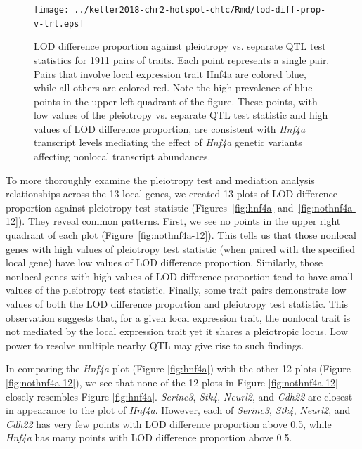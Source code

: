 \documentclass[oneside]{book}\usepackage[]{graphicx}\usepackage[]{color}
\begin{document}
\begin{figure}
    \centering
    \texttt{[image: ../keller2018-chr2-hotspot-chtc/Rmd/lod-diff-prop-v-lrt.eps]}
    \caption[LOD difference proportion vs. pleiotropy test statistic]{LOD difference proportion against pleiotropy vs. separate QTL test statistics for 1911 pairs of traits. 
    Each point represents a single pair. Pairs that involve local expression trait Hnf4a are colored blue, while all others are colored red. 
    Note the high prevalence of blue points in the upper left quadrant of the figure. 
    These points, with low values of the pleiotropy vs. separate QTL test statistic and 
    high values of LOD difference proportion, are consistent with \emph{Hnf4a} transcript 
    levels mediating the effect of \emph{Hnf4a} genetic variants affecting nonlocal 
    transcript abundances.}
    \label{fig:lod-diff-prop-v-lrt-all}
\end{figure}


To more thoroughly examine the pleiotropy test and mediation analysis 
relationships across the 13 local genes, 
we created 13 plots of LOD difference proportion against pleiotropy test 
statistic (Figures~\ref{fig:hnf4a} and~\ref{fig:nothnf4a-12}). 
They reveal common patterns. 
First, we see no points in the upper right quadrant of each plot (Figure~\ref{fig:nothnf4a-12}). 
This tells us that those nonlocal genes with high values of pleiotropy test statistic 
(when paired with the specified local gene) have low values of LOD difference proportion. 
Similarly, those nonlocal genes with high values of LOD difference proportion tend 
to have small values of the pleiotropy test statistic. 
Finally, some trait pairs demonstrate low values of both 
the LOD difference proportion and pleiotropy test statistic. 
This observation suggests that, for a given local expression trait, the nonlocal trait 
is not mediated by the local expression trait yet it shares a pleiotropic locus. 
Low power to resolve multiple nearby QTL may give rise to such findings.

In comparing the \emph{Hnf4a} plot (Figure \ref{fig:hnf4a}) with the other 
12 plots (Figure \ref{fig:nothnf4a-12}), 
we see that none of the 12 plots in Figure \ref{fig:nothnf4a-12} closely resembles Figure \ref{fig:hnf4a}. 
\emph{Serinc3}, \emph{Stk4}, \emph{Neurl2}, and \emph{Cdh22} are closest in appearance to the plot of \emph{Hnf4a}. 
However, each of \emph{Serinc3}, \emph{Stk4}, \emph{Neurl2}, and \emph{Cdh22} 
has very few points with LOD difference proportion above 0.5, 
while \emph{Hnf4a} has many points with LOD difference proportion above 0.5.
\end{document}
